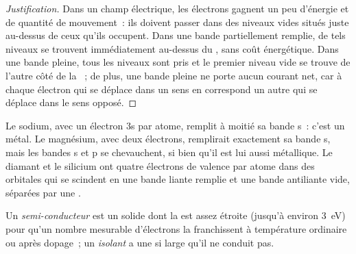 \begin{proof}[Justification]
Dans un champ électrique, les électrons gagnent un peu d'énergie et de
quantité de mouvement~: ils doivent passer dans des niveaux vides situés
juste au-dessus de ceux qu'ils occupent. Dans une bande partiellement
remplie, de tels niveaux se trouvent immédiatement au-dessus du , sans coût énergétique. Dans une bande pleine, tous les niveaux sont
pris et le premier niveau vide se trouve de l'autre côté de la ~; de plus, une bande pleine ne porte aucun courant net, car à
chaque électron qui se déplace dans un sens en correspond un autre qui se
déplace dans le sens opposé.
\end{proof}

Le sodium, avec un électron 3s par atome, remplit à moitié sa bande s~:
c'est un métal. Le magnésium, avec deux électrons, remplirait exactement sa
bande s, mais les bandes s et p se chevauchent, si bien qu'il est lui aussi
métallique. Le diamant et le silicium ont quatre électrons de valence par
atome dans des orbitales qui se scindent en une bande liante remplie et une
bande antiliante vide, séparées par une .

\begin{definition}\label{def:b3:solid-state:classes}
Un \emph{semi-conducteur} est un solide dont la
 est assez étroite (jusqu'à environ \qty{3}{eV}) pour qu'un
nombre mesurable d'électrons la franchissent à température ordinaire ou
après dopage~; un \emph{isolant} a une  si
large qu'il ne conduit pas.
\end{definition}

